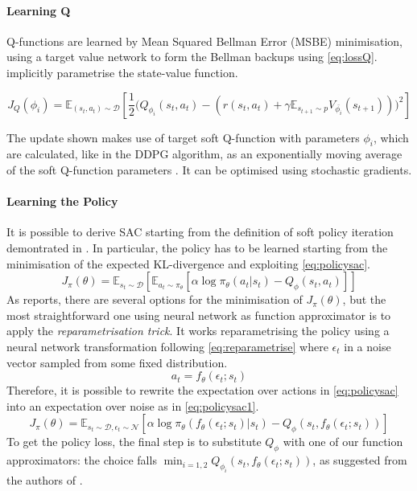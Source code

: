 \paragraph{Learning Q} Q-functions are learned by Mean Squared Bellman Error (MSBE) minimisation, using a target value network to form the Bellman backups using \vref{eq:lossQ}.  implicitly parametrise the state-value function.

\begin{equation} \label{eq:lossQ}
	J_Q(\phi_i) = \mathbb{E}_{(s_t,a_t) \sim \mathcal D}\left[ \frac{1}{2}\Bigg( Q_{\phi_i}(s_t,a_t) - \left(r(s_t, a_t) + \gamma \mathbb{E}_{s_{t+1} \sim p} V_{\bar{\phi_i}}(s_{t+1}) \right) \Bigg)^2 \right]
\end{equation}


The update shown makes use of target soft Q-function with parameters $\phi_i$, which are calculated, like in the DDPG algorithm, as an exponentially moving average of the soft Q-function parameters \cite{mnih2015human}. It can be optimised using stochastic gradients.

\paragraph{Learning the Policy} It is possible to derive SAC starting from the definition of soft policy iteration demontrated in   \cite[Section 4]{haarnoja2018alg}. In particular, the policy has to be learned starting from the minimisation of the expected KL-divergence \cite{kullback1959information,kullback1951information} and exploiting \vref{eq:policysac}.
\begin{equation} \label{eq:policysac}
	J_\pi(\theta) = \mathbb{E}_{s_t \sim \mathcal{D}}[\mathbb{E}_{a_t \sim \pi_\theta}[\alpha \log \pi_\theta(a_t|s_t) - Q_\phi(s_t,a_t)]]
\end{equation}
As \cite{haarnoja2018alg} reports, there are several options for the minimisation of $J_\pi(\theta)$, but the most straightforward one using neural network as function approximator is to apply the \textit{reparametrisation trick}.
It works reparametrising the policy using a neural network transformation following \vref{eq:reparametrise} where $\epsilon_t$ in a noise vector sampled from some fixed distribution.
\begin{equation} \label{eq:reparametrise}
	a_t = f_\theta(\epsilon_t; s_t)
\end{equation}
Therefore, it is possible to rewrite the expectation over actions in \vref{eq:policysac} into an expectation over noise as in \vref{eq:policysac1}.
\begin{equation} \label{eq:policysac1}
	J_\pi(\theta) = \mathbb{E}_{s_t \sim \mathcal{D}, \epsilon_t \sim \mathcal{N}}[\alpha \log \pi_\theta(f_\theta(\epsilon_t; s_t)|s_t) - Q_\phi(s_t,f_\theta(\epsilon_t; s_t))]
\end{equation}
To get the policy loss, the final step is to substitute $Q_{\phi}$ with one of our function approximators: the choice falls $\min_{i=1,2}Q_{\phi_i}(s_t, f_\theta(\epsilon_t; s_t))$, as suggested from the authors of \cite{haarnoja2018alg}.

